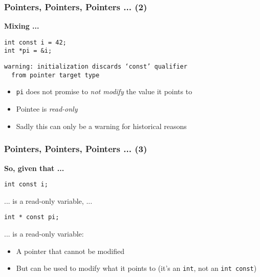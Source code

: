 \begin{frame}[fragile]
  \frametitle{Pointers, Pointers, Pointers ... (2)}

  \textbf{Mixing ...}

  \begin{block}{}
\begin{verbatim}
int const i = 42;
int *pi = &i;
\end{verbatim}
  \end{block}

  \begin{block}{}
\begin{verbatim}
warning: initialization discards ‘const’ qualifier 
  from pointer target type
\end{verbatim}
  \end{block}

  \begin{itemize}
  \item \texttt{pi} does not promise to \textit{not modify} the value
    it points to
  \item Pointee is \textit{read-only}
  \item Sadly this can only be a warning for historical reasons
  \end{itemize}

\end{frame}

\begin{frame}[fragile]
  \frametitle{Pointers, Pointers, Pointers ... (3)}

  \textbf{So, given that ...}

  \begin{block}{}
\begin{verbatim}
int const i;
\end{verbatim}
  \end{block}

  ... is a read-only variable, ...

  \begin{block}{}
\begin{verbatim}
int * const pi;
\end{verbatim}
  \end{block}

  ... is a read-only variable:

  \begin{itemize}
  \item A pointer that cannot be modified
  \item But can be used to modify what it points to (it's an
    \texttt{int}, not an \texttt{int const})
  \end{itemize}

\end{frame}

